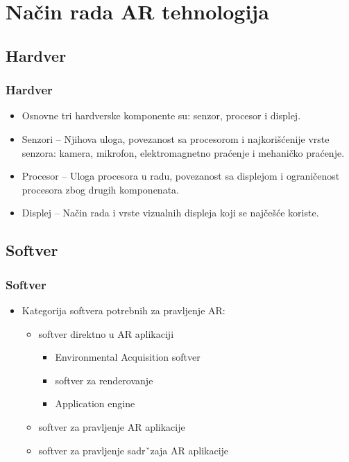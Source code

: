\documentclass[9pt]{beamer}
\begin{document}
\section{Način rada AR tehnologija}
\subsection{Hardver}
	\begin{frame}
 \frametitle{Hardver}
        \begin{itemize}
            \setlength\itemsep{1.5em}
                \item Osnovne tri hardverske komponente su: senzor, procesor i displej.
                \item Senzori – Njihova uloga, povezanost sa procesorom i najkorišćenije vrste senzora: kamera, mikrofon, elektromagnetno praćenje i mehaničko 			praćenje.
                \item Procesor – Uloga procesora u radu, povezanost sa displejom i ograničenost procesora zbog drugih komponenata.
                \item Displej – Način rada i vrste vizualnih displeja koji se najčešće koriste.
        \end{itemize}
            
	\end{frame}

\subsection{Softver}
	\begin{frame}
 \frametitle{Softver}
        \begin{itemize}
            \setlength\itemsep{1.5em}
                \item Kategorija softvera potrebnih za pravljenje AR:
                \begin{itemize}
                \setlength\itemsep{1.5em}
                    \item softver direktno u AR aplikaciji
                    \begin{itemize}
                        \item Environmental Acquisition softver 
                        \item softver za renderovanje
                        \item Application engine
                    \end{itemize}
                    \item softver za pravljenje AR aplikacije
                    \item softver za pravljenje sadrˇzaja AR aplikacije
                \end{itemize}
        \end{itemize}
            
	\end{frame}
 
\end{document}
